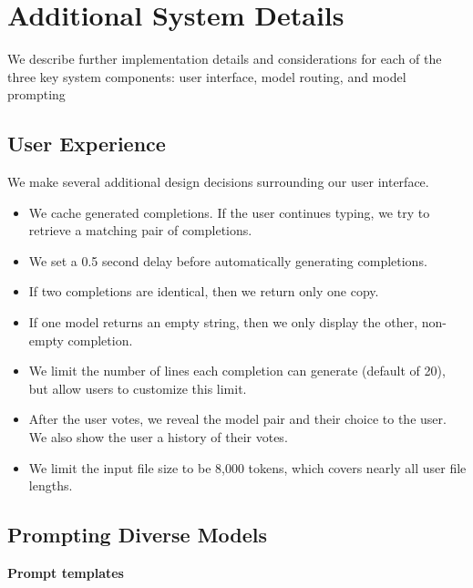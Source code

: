 

\section{Additional System Details}
\label{appdx:system}

We describe further implementation details and considerations for each of the three key system components: user interface, model routing, and model prompting

\subsection{User Experience}
\label{sec:appendix-interface}

We make several additional design decisions surrounding our user interface.
\begin{itemize}
    \item We cache generated completions. If the user continues typing, we try to retrieve a matching pair of completions.
    \item We set a 0.5 second delay before automatically generating completions.
    \item If two completions are identical, then we return only one copy.
    \item If one model returns an empty string, then we only display the other, non-empty completion.
    \item We limit the number of lines each completion can generate (default of 20), but allow users to customize this limit.
    \item After the user votes, we reveal the model pair and their choice to the user. We also show the user a history of their votes.
    \item We limit the input file size to be 8,000 tokens, which covers nearly all user file lengths.
\end{itemize}



\subsection{Prompting Diverse Models}
\label{sec:appendix-prompt}

\textbf{Prompt templates}


